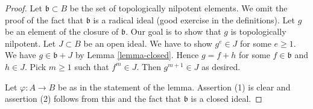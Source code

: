 \documentclass{stacks-project}
\theoremstyle{plain}
\theoremstyle{definition}
\theoremstyle{remark}
\numberwithin{equation}{subsection}
\begin{document}
\begin{proof}
Let $\mathfrak b \subset B$ be the set of topologically nilpotent elements.
We omit the proof of the fact that $\mathfrak b$ is a radical ideal
(good exercise in the definitions). Let $g$ be an element of the closure
of $\mathfrak b$. Our goal is to show that $g$ is topologically nilpotent.
Let $J \subset B$ be an open ideal. We have to show
$g^e \in J$ for some $e \geq 1$. We have $g \in \mathfrak b + J$
by Lemma \ref{lemma-closed}. Hence $g = f + h$
for some $f \in \mathfrak b$ and $h \in J$. Pick $m \geq 1$ such that
$f^m \in J$. Then $g^{m + 1} \in J$ as desired.

\medskip\noindent
Let $\varphi : A \to B$ be as in the statement of the lemma.
Assertion (1) is clear and assertion (2) follows from this and
the fact that $\mathfrak b$ is a closed ideal.
\end{proof}
\end{document}
